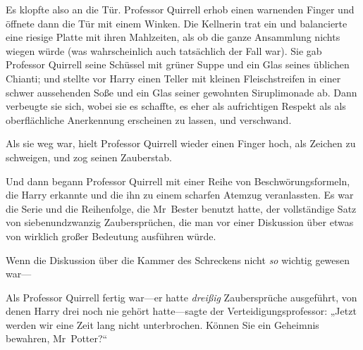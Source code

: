 Es klopfte also an die Tür. Professor Quirrell erhob einen warnenden Finger und öffnete dann die Tür mit einem Winken. Die Kellnerin trat ein und balancierte eine riesige Platte mit ihren Mahlzeiten, als ob die ganze Ansammlung nichts wiegen würde (was wahrscheinlich auch tatsächlich der Fall war). Sie gab Professor Quirrell seine Schüssel mit grüner Suppe und ein Glas seines üblichen Chianti; und stellte vor Harry einen Teller mit kleinen Fleischstreifen in einer schwer aussehenden Soße und ein Glas seiner gewohnten Siruplimonade ab. Dann verbeugte sie sich, wobei sie es schaffte, es eher als aufrichtigen Respekt als als oberflächliche Anerkennung erscheinen zu lassen, und verschwand.

Als sie weg war, hielt Professor Quirrell wieder einen Finger hoch, als Zeichen zu schweigen, und zog seinen Zauberstab.

Und dann begann Professor Quirrell mit einer Reihe von Beschwörungsformeln, die Harry erkannte und die ihn zu einem scharfen Atemzug veranlassten. Es war die Serie und die Reihenfolge, die Mr~Bester benutzt hatte, der vollständige Satz von siebenundzwanzig Zaubersprüchen, die man vor einer Diskussion über etwas von wirklich großer Bedeutung ausführen würde.

Wenn die Diskussion über die Kammer des Schreckens nicht \emph{so} wichtig gewesen war—

Als Professor Quirrell fertig war—er hatte \emph{dreißig} Zaubersprüche ausgeführt, von denen Harry drei noch nie gehört hatte—sagte der Verteidigungsprofessor: „Jetzt werden wir eine Zeit lang nicht unterbrochen. Können Sie ein Geheimnis bewahren, Mr~Potter?“

